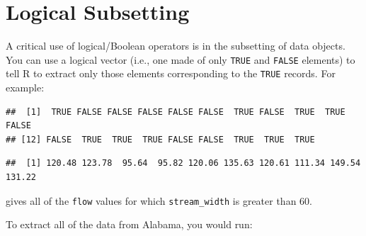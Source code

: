 \documentclass[]{book}
\newenvironment{Shaded}{\begin{snugshade}}{\end{snugshade}}
\newcommand{\CommentTok}[1]{\textcolor[rgb]{0.56,0.35,0.01}{\textit{#1}}}
\newcommand{\DecValTok}[1]{\textcolor[rgb]{0.00,0.00,0.81}{#1}}
\newcommand{\NormalTok}[1]{#1}
\newcommand{\OperatorTok}[1]{\textcolor[rgb]{0.81,0.36,0.00}{\textbf{#1}}}
\newcommand{\StringTok}[1]{\textcolor[rgb]{0.31,0.60,0.02}{#1}}
\begin{document}
\hypertarget{logsub}{%
\section{Logical Subsetting}\label{logsub}}

A critical use of logical/Boolean operators is in the subsetting of data objects. You can use a logical vector (i.e., one made of only \texttt{TRUE} and \texttt{FALSE} elements) to tell R to extract only those elements corresponding to the \texttt{TRUE} records. For example:

\begin{Shaded}
\end{Shaded}

\begin{verbatim}
##  [1]  TRUE FALSE FALSE FALSE FALSE FALSE  TRUE FALSE  TRUE  TRUE FALSE
## [12] FALSE  TRUE  TRUE  TRUE FALSE FALSE  TRUE  TRUE  TRUE
\end{verbatim}

\begin{Shaded}
\end{Shaded}

\begin{verbatim}
##  [1] 120.48 123.78  95.64  95.82 120.06 135.63 120.61 111.34 149.54 131.22
\end{verbatim}

gives all of the \texttt{flow} values for which \texttt{stream\_width} is greater than 60.

To extract all of the data from Alabama, you would run:

\begin{Shaded}
\end{Shaded}
\end{document}
